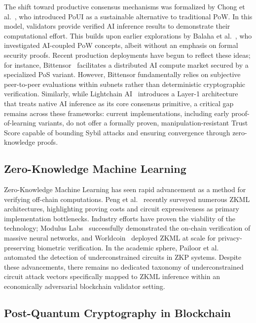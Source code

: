 \documentclass[journal]{IEEEtran}
\begin{document}
The shift toward productive consensus mechanisms was formalized by Chong et al.~\cite{chong2025poui}, who introduced PoUI as a sustainable alternative to traditional PoW. In this model, validators provide verified AI inference results to demonstrate their computational effort. This builds upon earlier explorations by Balaha et al.~\cite{balaha2020pow}, who investigated AI-coupled PoW concepts, albeit without an emphasis on formal security proofs. Recent production deployments have begun to reflect these ideas; for instance, Bittensor~\cite{bittensor2024} facilitates a distributed AI compute market secured by a specialized PoS variant. However, Bittensor fundamentally relies on subjective peer-to-peer evaluations within subnets rather than deterministic cryptographic verification. Similarly, while Lightchain AI~\cite{lightchain2025} introduces a Layer-1 architecture that treats native AI inference as its core consensus primitive, a critical gap remains across these frameworks: current implementations, including early proof-of-learning variants, do not offer a formally proven, manipulation-resistant Trust Score capable of bounding Sybil attacks and ensuring convergence through zero-knowledge proofs.

\subsection{Zero-Knowledge Machine Learning}

Zero-Knowledge Machine Learning has seen rapid advancement as a method for verifying off-chain computations. Peng et al.~\cite{peng2025zkml} recently surveyed numerous ZKML architectures, highlighting proving costs and circuit expressiveness as primary implementation bottlenecks. Industry efforts have proven the viability of the technology; Modulus Labs~\cite{modulus2024} successfully demonstrated the on-chain verification of massive neural networks, and Worldcoin~\cite{worldcoin2023} deployed ZKML at scale for privacy-preserving biometric verification. In the academic sphere, Pailoor et al.~\cite{pailoor2023ccs} automated the detection of underconstrained circuits in ZKP systems. Despite these advancements, there remains no dedicated taxonomy of underconstrained circuit attack vectors specifically mapped to ZKML inference within an economically adversarial blockchain validator setting.

\subsection{Post-Quantum Cryptography in Blockchain}
\end{document}
